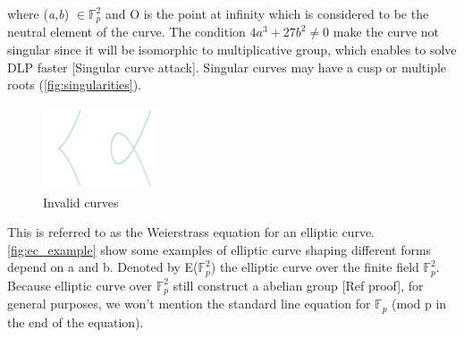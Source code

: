 where (\emph{a,b}) $\in\mathbb{F}_{p}^2$ and O is the point at infinity which is considered to be the neutral element of the curve. The condition $4a^3 + 27b^2 \neq 0$ make the curve not singular since it will be isomorphic to multiplicative group, which enables to solve DLP faster [Singular curve attack]. Singular curves may have a cusp or multiple roots (\autoref{fig:singularities}).

\begin{figure}[ht!]
  \centering
  \includegraphics[width=0.3\textwidth]{images/singularities.png}
  \caption[Invalid curves]{Invalid curves}
  \label{fig:singularities}
\end{figure}

This is referred to as the Weierstrass equation for an elliptic curve.
\autoref{fig:ec_example} show some examples of elliptic curve shaping different forms depend on a and b.
Denoted by E($\mathbb{F}_{p}^2$) the elliptic curve over the finite field $\mathbb{F}_{p}^2$.
Because elliptic curve over $\mathbb{F}_{p}^2$ still construct a abelian group [Ref proof], for general purposes, we won't mention the standard line equation for $\mathbb{F}_{p}$ (mod p in the end of the equation).


